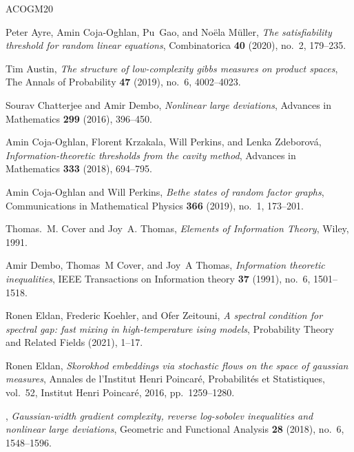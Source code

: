 \documentclass[11pt]{article}
\numberwithin{equation}{section}
\theoremstyle{myremark}
\theoremstyle{myremark}
\theoremstyle{myexample}
\newcommand{\1}{\mathbf{1}}
\begin{document}
\begin{thebibliography}{ACOGM20}

Peter Ayre, Amin Coja-Oghlan, Pu~Gao, and No{\"e}la M{\"u}ller, \emph{The
  satisfiability threshold for random linear equations}, Combinatorica
  \textbf{40} (2020), no.~2, 179--235.

Tim Austin, \emph{The structure of low-complexity gibbs measures on product
  spaces}, The Annals of Probability \textbf{47} (2019), no.~6, 4002--4023.

Sourav Chatterjee and Amir Dembo, \emph{Nonlinear large deviations}, Advances
  in Mathematics \textbf{299} (2016), 396--450.

Amin Coja-Oghlan, Florent Krzakala, Will Perkins, and Lenka Zdeborov{\'a},
  \emph{Information-theoretic thresholds from the cavity method}, Advances in
  Mathematics \textbf{333} (2018), 694--795.

Amin Coja-Oghlan and Will Perkins, \emph{Bethe states of random factor graphs},
  Communications in Mathematical Physics \textbf{366} (2019), no.~1, 173--201.

Thomas.~M. Cover and Joy~A. Thomas, \emph{{Elements of Information Theory}},
  Wiley, 1991.

Amir Dembo, Thomas~M Cover, and Joy~A Thomas, \emph{Information theoretic
  inequalities}, IEEE Transactions on Information theory \textbf{37} (1991),
  no.~6, 1501--1518.

Ronen Eldan, Frederic Koehler, and Ofer Zeitouni, \emph{A spectral condition
  for spectral gap: fast mixing in high-temperature ising models}, Probability
  Theory and Related Fields (2021), 1--17.

Ronen Eldan, \emph{Skorokhod embeddings via stochastic flows on the space of
  gaussian measures}, Annales de l'Institut Henri Poincar{\'e},
  Probabilit{\'e}s et Statistiques, vol.~52, Institut Henri Poincar{\'e}, 2016,
  pp.~1259--1280.

\bysame, \emph{Gaussian-width gradient complexity, reverse log-sobolev
  inequalities and nonlinear large deviations}, Geometric and Functional
  Analysis \textbf{28} (2018), no.~6, 1548--1596.


\end{thebibliography}
\end{document}
